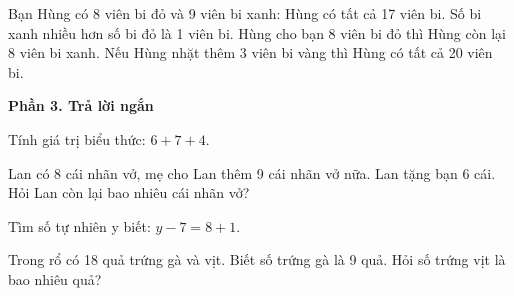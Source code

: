 \begin{ex} %
Bạn Hùng có 8 viên bi đỏ và 9 viên bi xanh:
\choiceTF
{\True Hùng có tất cả 17 viên bi.}
{\True Số bi xanh nhiều hơn số bi đỏ là 1 viên bi.}
{Hùng cho bạn 8 viên bi đỏ thì Hùng còn lại 8 viên bi xanh.}
{\True Nếu Hùng nhặt thêm 3 viên bi vàng thì Hùng có tất cả 20 viên bi.}
\end{ex}

\textbf{Phần 3. Trả lời ngắn}

\begin{ex} %
Tính giá trị biểu thức: $6 + 7 + 4$.
\end{ex}

\begin{ex} %
Lan có 8 cái nhãn vở, mẹ cho Lan thêm 9 cái nhãn vở nữa. Lan tặng bạn 6 cái. Hỏi Lan còn lại bao nhiêu cái nhãn vở?
\end{ex}

\begin{ex} %
Tìm số tự nhiên y biết: $y - 7 = 8 + 1$.
\end{ex}

\begin{ex} %
Trong rổ có 18 quả trứng gà và vịt. Biết số trứng gà là 9 quả. Hỏi số trứng vịt là bao nhiêu quả?
\end{ex}

